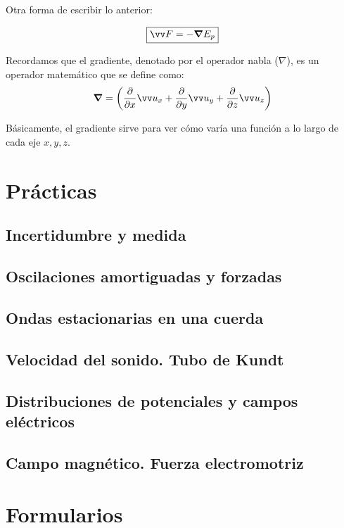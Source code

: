 \documentclass[a4paper]{book}
\begin{document}
Otra forma de escribir lo anterior:

\[\boxed{\vec{F} = -\grad E_p}\]

Recordamos que el gradiente, denotado por el operador nabla ($\nabla$), es un operador matemático que se define como: \[\grad = \left( \pdv{}{x}\vec{u_x} + \pdv{}{y}\vec{u_y} + \pdv{}{z}\vec{u_z}   \right)\]

Básicamente, el gradiente sirve para ver cómo varía una función a lo largo de cada eje $x, y, z$.

\chapter{Prácticas}


\section{Incertidumbre y medida}

\section{Oscilaciones amortiguadas y forzadas}

\section{Ondas estacionarias en una cuerda}

\section{Velocidad del sonido. Tubo de Kundt}

\section{Distribuciones de potenciales y campos eléctricos}

\section{Campo magnético. Fuerza electromotriz}

\setlength{\parskip}{0em}
\chapter{Formularios}
\end{document}
